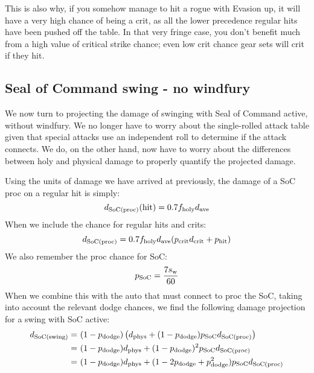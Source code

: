This is also why, if you somehow manage to hit a rogue with Evasion up, it will have a very high chance of being a crit, as all the lower precedence regular hits have been pushed off the table.
In that very fringe case, you don't benefit much from a high value of critical strike chance; even low crit chance gear sets will crit if they hit.

\subsection{Seal of Command swing - no windfury}
We now turn to projecting the damage of swinging with Seal of Command active, without windfury.
We no longer have to worry about the single-rolled attack table given that special attacks use an independent roll to determine if the attack connects.
We do, on the other hand, now have to worry about the differences between holy and physical damage to properly quantify the projected damage.

Using the units of damage we have arrived at previously, the damage of a SoC proc on a regular hit is simply:
\begin{equation}
	d_\mathrm{SoC(proc)} (\mathrm{hit}) = 0.7 f_{\mathrm{holy}}  d_{\mathrm{ave}}  
\end{equation}
When we include the chance for regular hits and crits:
\begin{equation}
	d_\mathrm{SoC(proc)}  = 0.7 f_{\mathrm{holy}}  d_{\mathrm{ave}}  ( p_{\mathrm{crit}}  d_{\mathrm{crit}}  + p_{\mathrm{hit}} )
\end{equation}
We also remember the proc chance for SoC:
\begin{equation}
	p_\mathrm{SoC}   = \frac{7 s_\mathrm{w} }{60}
\end{equation}
When we combine this with the auto that must connect to proc the SoC, taking into account the relevant dodge chances, we find the following damage projection for a swing with SoC active:
\begin{equation*}
	\begin{aligned}
		d_\mathrm{SoC(swing)}  =&~ (1-p_{\mathrm{dodge}} ) \left( d_{\mathrm{phys}}  + (1 - p_{\mathrm{dodge}} ) p_\mathrm{SoC}   d_\mathrm{SoC(proc)}  \right) \\
		=&~ (1 - p_{\mathrm{dodge}} ) d_{\mathrm{phys}}  + (1 - p_{\mathrm{dodge}} )^2 p_\mathrm{SoC}   d_\mathrm{SoC(proc)} \\
		=&~ (1 - p_{\mathrm{dodge}} ) d_{\mathrm{phys}}  + (1 - 2p_{\mathrm{dodge}}  + p_{\mathrm{dodge}} ^2 ) p_\mathrm{SoC}   d_\mathrm{SoC(proc)} \\
	\end{aligned}
\end{equation*}

